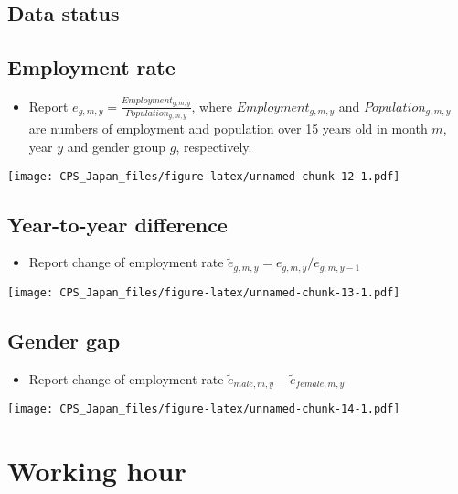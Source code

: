 \documentclass[
]{book}
\providecommand{\tightlist}{%
  \setlength{\itemsep}{0pt}\setlength{\parskip}{0pt}}
\begin{document}
\hypertarget{data-status}{%
\section{Data status}\label{data-status}}

\hypertarget{employment-rate-2}{%
\section{Employment rate}\label{employment-rate-2}}

\begin{itemize}
\tightlist
\item
  Report \(e_{g,m,y} = \frac{Employment_{g,m,y}}{Population_{g,m,y}}\), where \(Employment_{g,m,y}\) and \(Population_{g,m,y}\) are numbers of employment and population over 15 years old in month \(m\), year \(y\) and gender group \(g\), respectively.
\end{itemize}

\texttt{[image: CPS\_Japan\_files/figure-latex/unnamed-chunk-12-1.pdf]}

\hypertarget{year-to-year-difference-2}{%
\section{Year-to-year difference}\label{year-to-year-difference-2}}

\begin{itemize}
\tightlist
\item
  Report change of employment rate \(\tilde e_{g,m,y}=e_{g,m,y}/e_{g,m,y-1}\)
\end{itemize}

\texttt{[image: CPS\_Japan\_files/figure-latex/unnamed-chunk-13-1.pdf]}

\hypertarget{gender-gap-2}{%
\section{Gender gap}\label{gender-gap-2}}

\begin{itemize}
\tightlist
\item
  Report change of employment rate \(\tilde e_{male,m,y}-\tilde e_{female,m,y}\)
\end{itemize}

\texttt{[image: CPS\_Japan\_files/figure-latex/unnamed-chunk-14-1.pdf]}

\hypertarget{working-hour}{%
\chapter{Working hour}\label{working-hour}}
\end{document}

